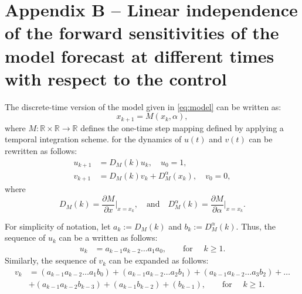 \documentclass{article}
\begin{document}
\section*{Appendix B -- Linear independence of the forward sensitivities of the model forecast at different times with respect to the control} \label{sec:appB} \appendix
The discrete-time version of the model given in \cref{eq:model} can be written as:
\begin{equation}
    x_{k+1} = M(x_k,\alpha), \label{eq:model_discrete}
\end{equation}
where $M:\mathbb{R} \times \mathbb{R} \to \mathbb{R}$ defines the one-time step mapping defined by applying a temporal integration scheme.  for the dynamics of $u(t)$ and $v(t)$ can be rewritten as follows:
\begin{equation}
\begin{aligned}
    u_{k+1} &= D_M(k) u_k, \quad u_0 = 1,\\
    v_{k+1} &= D_M(k) v_k + D_M^{\alpha}(x_k), \quad v_0 = 0,
\end{aligned} \label{eq:sens_discrete}
\end{equation}
where
\begin{equation}
    D_M(k) = \dfrac{\partial M}{\partial x}\bigg|_{x=x_k}, \quad \text{and} \quad D_M^{\alpha}(k) = \dfrac{\partial M}{\partial \alpha}\bigg|_{x=x_k}.
\end{equation}

For simplicity of notation, let $a_k:=D_M(k)$ and $b_k:=D_M^{\alpha}(k)$. Thus, the sequence of $u_k$ can be a written as follows:
\begin{equation}
    \begin{aligned}
        u_k & = a_{k-1} a_{k-2} \dots a_1 a_0 , \qquad \text{for } \quad k \ge 1.
    \end{aligned}
\end{equation}
Similarly, the sequence of $v_k$ can be expanded as follows:
\begin{equation}
    \begin{aligned}
        v_k &= (a_{k-1} a_{k-2} \dots a_1 b_0) 
             + (a_{k-1} a_{k-2} \dots a_2 b_1)
             + (a_{k-1} a_{k-2} \dots a_3 b_2) 
             + \dots \\
             &+ (a_{k-1} a_{k-2} b_{k-3}) + (a_{k-1} b_{k-2}) + (b_{k-1}), \qquad \text{for } \quad k \ge 1. 
    \end{aligned}
\end{equation}
\end{document}
